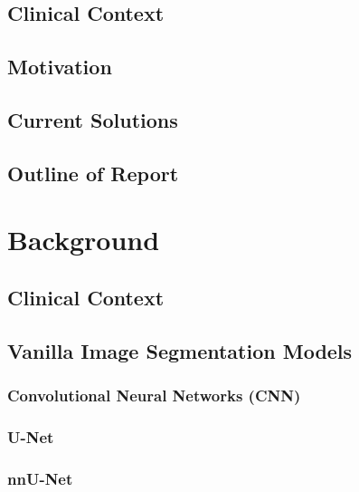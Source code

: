 \documentclass[11pt,twoside]{report}
\begin{document}
\section{Clinical Context} \label{sect:clinical-context-summary}

\section{Motivation}\label{sect:motivation}
% 

\section{Current Solutions}\label{sect:current-solutions}
% 

\section{Outline of Report}\label{sect:outline-of-report}

\chapter{Background}\label{sect:background}

\section{Clinical Context}\label{sect:clinical-context}

\section{Vanilla Image Segmentation Models}\label{sect:vanilla-image-segmentation-models}

\subsection{Convolutional Neural Networks (CNN)}\label{sect:CNNs}

\subsection{U-Net}\label{sect:u-net}

\subsection{nnU-Net}\label{sect:nnu-net}
\end{document}
